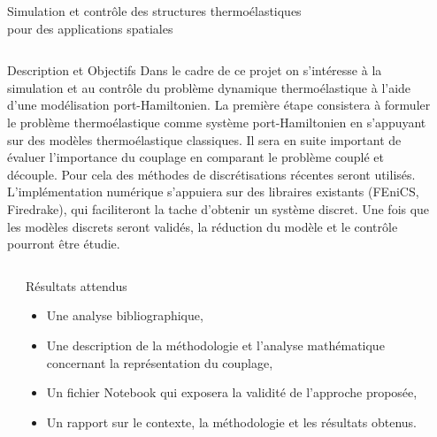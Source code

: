 \documentclass[final]{beamer}
\newlength{\sepwid}
\begin{document}
\begin{frame}[t]{\LARGE \hspace{13cm}
Simulation et contrôle des structures thermoélastiques \\ \hspace{13cm} pour des applications spatiales
}
\begin{columns}
\begin{column}{0.95\textwidth}
\begin{block}{Description et Objectifs \vspace{1cc}}
Dans le cadre de ce projet on s'intéresse à la simulation et au contrôle du problème dynamique thermoélastique à l'aide d'une modélisation port-Hamiltonien. La première étape consistera à formuler le problème thermoélastique comme système port-Hamiltonien en s'appuyant sur des modèles thermoélastique classiques. Il sera en suite important de évaluer l'importance du couplage en comparant le problème couplé et découple. Pour cela des méthodes de discrétisations récentes seront utilisés. L'implémentation numérique s'appuiera sur des libraires existants (FEniCS, Firedrake), qui faciliteront la tache d'obtenir un système discret. Une fois que les modèles discrets seront validés, la réduction du modèle et le contrôle pourront être étudie. \\

\end{block}
\end{column} 

\begin{column}{\sepwid}\end{column} %

\end{columns}

\begin{columns} 
	\begin{column}{\sepwid}\end{column} %
	
	\begin{column}{0.95\textwidth}
		\begin{block}{Résultats attendus \vspace{1cc}}
		\begin{itemize}
			\item Une analyse bibliographique,
			\item Une description de la méthodologie et l’analyse mathématique concernant la représentation du couplage,
			\item Un fichier Notebook qui exposera la validité de l’approche proposée,
			\item Un rapport sur le contexte, la méthodologie et les résultats obtenus.
		\end{itemize}
		\end{block}
	\end{column} 
	\begin{column}{\sepwid}\end{column} %
\end{columns}


\end{frame}
\end{document}
